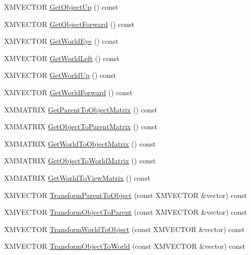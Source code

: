 \begin{DoxyCompactItemize}
\item 
X\+M\+V\+E\+C\+T\+OR \hyperlink{structmage_1_1_transform_a68a9a599104b976b01aea39cc8ab03d2}{Get\+Object\+Up} () const
\item 
X\+M\+V\+E\+C\+T\+OR \hyperlink{structmage_1_1_transform_affc4bcfe6ca76005db8676de867aede0}{Get\+Object\+Forward} () const
\item 
X\+M\+V\+E\+C\+T\+OR \hyperlink{structmage_1_1_transform_a41ba0976f707bc9bcfa646e53d7e9507}{Get\+World\+Eye} () const
\item 
X\+M\+V\+E\+C\+T\+OR \hyperlink{structmage_1_1_transform_aef18a0e685f56ce4a805b2fef57287f6}{Get\+World\+Left} () const
\item 
X\+M\+V\+E\+C\+T\+OR \hyperlink{structmage_1_1_transform_af28786b745a144eef74d69a55055b00a}{Get\+World\+Up} () const
\item 
X\+M\+V\+E\+C\+T\+OR \hyperlink{structmage_1_1_transform_a24bd3a710a3c0bde7a6d2f2de56a315c}{Get\+World\+Forward} () const
\item 
X\+M\+M\+A\+T\+R\+IX \hyperlink{structmage_1_1_transform_a66eee9c51ff050924d35c3747083593f}{Get\+Parent\+To\+Object\+Matrix} () const
\item 
X\+M\+M\+A\+T\+R\+IX \hyperlink{structmage_1_1_transform_a8da2bed8599b4f012ac85af9d76c7f37}{Get\+Object\+To\+Parent\+Matrix} () const
\item 
X\+M\+M\+A\+T\+R\+IX \hyperlink{structmage_1_1_transform_a773c1db9e475deb6d9f446a88cfae30f}{Get\+World\+To\+Object\+Matrix} () const
\item 
X\+M\+M\+A\+T\+R\+IX \hyperlink{structmage_1_1_transform_a6fe97738bf9ae9d1e677c3e09b8c6d81}{Get\+Object\+To\+World\+Matrix} () const
\item 
X\+M\+M\+A\+T\+R\+IX \hyperlink{structmage_1_1_transform_a33cc590d779f69044d183bab653bd260}{Get\+World\+To\+View\+Matrix} () const
\item 
X\+M\+V\+E\+C\+T\+OR \hyperlink{structmage_1_1_transform_ae218925fd8223d25d2532ac96722d8a0}{Transform\+Parent\+To\+Object} (const X\+M\+V\+E\+C\+T\+OR \&vector) const
\item 
X\+M\+V\+E\+C\+T\+OR \hyperlink{structmage_1_1_transform_af59658a7bd8f86961449e35b005c9c83}{Transform\+Object\+To\+Parent} (const X\+M\+V\+E\+C\+T\+OR \&vector) const
\item 
X\+M\+V\+E\+C\+T\+OR \hyperlink{structmage_1_1_transform_a9c4fc1d0667d7a0a816f874d99bc82cf}{Transform\+World\+To\+Object} (const X\+M\+V\+E\+C\+T\+OR \&vector) const
\item 
X\+M\+V\+E\+C\+T\+OR \hyperlink{structmage_1_1_transform_a3e5b476d0078f6bf243a7effa0f781fc}{Transform\+Object\+To\+World} (const X\+M\+V\+E\+C\+T\+OR \&vector) const

\end{DoxyCompactItemize}
